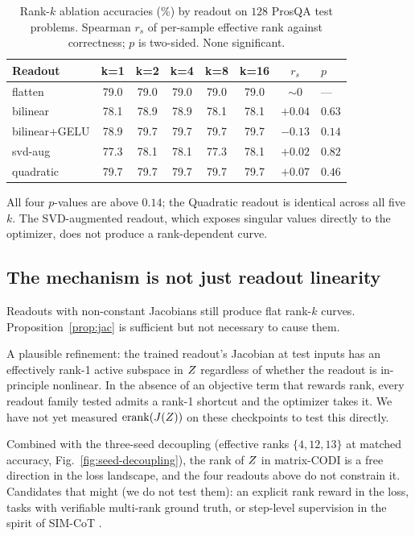 \begin{table}[t]
\caption{Rank-$k$ ablation accuracies (\%) by readout on $128$
ProsQA test problems. Spearman $r_s$ of per-sample effective rank
against correctness; $p$ is two-sided. None significant.}
\label{tab:pc}
\centering
\footnotesize
\setlength{\tabcolsep}{3pt}
\begin{tabular}{lccccccl}
\toprule
Readout & k{=}1 & k{=}2 & k{=}4 & k{=}8 & k{=}16 & $r_s$ & $p$ \\
\midrule
flatten       & 79.0 & 79.0 & 79.0 & 79.0 & 79.0 & $\sim\!0$ & --- \\
bilinear      & 78.1 & 78.9 & 78.9 & 78.1 & 78.1 & $+0.04$ & $0.63$ \\
bilinear+GELU & 78.9 & 79.7 & 79.7 & 79.7 & 79.7 & $-0.13$ & $0.14$ \\
svd-aug       & 77.3 & 78.1 & 78.1 & 77.3 & 78.1 & $+0.02$ & $0.82$ \\
quadratic     & 79.7 & 79.7 & 79.7 & 79.7 & 79.7 & $+0.07$ & $0.46$ \\
\bottomrule
\end{tabular}
\end{table}

All four $p$-values are above $0.14$; the Quadratic readout is
identical across all five $k$. The SVD-augmented readout, which
exposes singular values directly to the optimizer, does not produce
a rank-dependent curve.

\subsection{The mechanism is not just readout linearity}

Readouts with non-constant Jacobians still produce flat rank-$k$
curves. Proposition~\ref{prop:jac} is sufficient but not necessary
to cause them.

A plausible refinement: the trained readout's Jacobian at test
inputs has an effectively rank-1 active subspace in $Z$ regardless
of whether the readout is in-principle nonlinear. In the absence of
an objective term that rewards rank, every readout family tested
admits a rank-1 shortcut and the optimizer takes it. We have not
yet measured $\mathrm{erank}(J(Z))$ on these checkpoints to test
this directly.

Combined with the three-seed decoupling (effective ranks
$\{4,12,13\}$ at matched accuracy, Fig.~\ref{fig:seed-decoupling}),
the rank of $Z$ in matrix-CODI is a free direction in the loss
landscape, and the four readouts above do not constrain it.
Candidates that might (we do not test them): an explicit rank reward
in the loss, tasks with verifiable multi-rank ground truth, or
step-level supervision in the spirit of SIM-CoT
\citep{shen2025simcot}.

